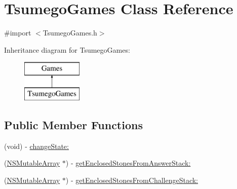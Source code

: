 \hypertarget{interface_tsumego_games}{
\section{TsumegoGames Class Reference}
\label{interface_tsumego_games}
}


{\ttfamily \#import $<$TsumegoGames.h$>$}

Inheritance diagram for TsumegoGames:\begin{figure}[H]
\begin{center}
\leavevmode
\includegraphics[height=2.000000cm]{interface_tsumego_games}
\end{center}
\end{figure}
\subsection*{Public Member Functions}
\begin{DoxyCompactItemize}
\item 
(void) -\/ \hyperlink{interface_tsumego_games_a52cfdea8f34f87b777e75607603af4a7}{changeState:}
\item 
(\hyperlink{class_n_s_mutable_array}{NSMutableArray} $\ast$) -\/ \hyperlink{interface_tsumego_games_a1214302231045c2a8d9325db7ab69083}{getEnclosedStonesFromAnswerStack:}
\item 
(\hyperlink{class_n_s_mutable_array}{NSMutableArray} $\ast$) -\/ \hyperlink{interface_tsumego_games_a1f08210c0c6886c19c1459d924f57c5c}{getEnclosedStonesFromChallengeStack:}
\end{DoxyCompactItemize}
